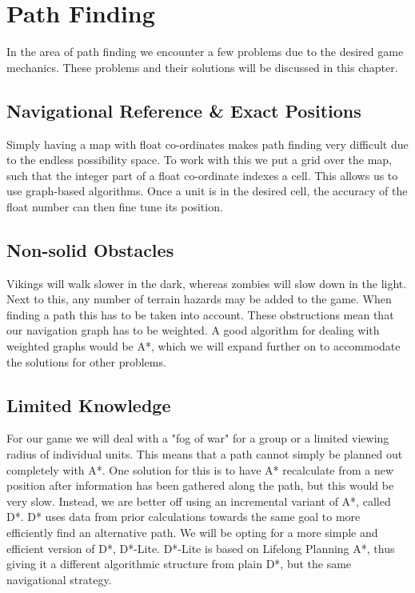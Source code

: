 \section{Path Finding}
In the area of path finding we encounter a few problems due to the desired game mechanics. These problems and their solutions will be discussed in this chapter.

\subsection{Navigational Reference \& Exact Positions}
Simply having a map with float co-ordinates makes path finding very difficult due to the endless possibility space. To work with this we put a grid over the map, such that the integer part of a float co-ordinate indexes a cell. This allows us to use graph-based algorithms. Once a unit is in the desired cell, the accuracy of the float number can then fine tune its position.

\subsection{Non-solid Obstacles}
Vikings will walk slower in the dark, whereas zombies will slow down in the light. Next to this, any number of terrain hazards may be added to the game. When finding a path this has to be taken into account. These obstructions mean that our navigation graph has to be weighted. A good algorithm for dealing with weighted graphs would be A*, which we will expand further on to accommodate the solutions for other problems.

\subsection{Limited Knowledge}
For our game we will deal with a "fog of war" for a group or a limited viewing radius of individual units. This means that a path cannot simply be planned out completely with A*. One solution for this is to have A* recalculate from a new position after information has been gathered along the path, but this would be very slow. Instead, we are better off using an incremental variant of A*, called D*. D* uses data from prior calculations towards the same goal to more efficiently find an alternative path. We will be opting for a more simple and efficient version of D*, D*-Lite. D*-Lite is based on Lifelong Planning A*, thus giving it a different algorithmic structure from plain D*, but the same navigational strategy. 

